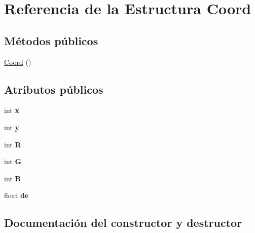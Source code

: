 \hypertarget{structCoord}{}\section{Referencia de la Estructura Coord}
\label{structCoord}
\subsection*{Métodos públicos}
\begin{DoxyCompactItemize}
\item 
\hyperlink{structCoord_add896c4f3fb15b4ad762b5270855345c}{Coord} ()
\end{DoxyCompactItemize}
\subsection*{Atributos públicos}
\begin{DoxyCompactItemize}
\item 
\mbox{\label{structCoord_a696eaa744360fc791d0e3b331c549dbe}} 
int {\bfseries x}
\item 
\mbox{\label{structCoord_a214166cca70cef7dda9201689c3e81ab}} 
int {\bfseries y}
\item 
\mbox{\label{structCoord_a8ead39d3c60427e2d428a15bfbd9b4d7}} 
int {\bfseries R}
\item 
\mbox{\label{structCoord_ae23b32f330c7da521781e27f23341dae}} 
int {\bfseries G}
\item 
\mbox{\label{structCoord_a178fbef489d3631b6f7e68f421cfec37}} 
int {\bfseries B}
\item 
\mbox{\label{structCoord_a1f17c799bd8f733668e637dd706013d9}} 
float {\bfseries de}
\end{DoxyCompactItemize}


\subsection{Documentación del constructor y destructor}
\mbox{\label{structCoord_add896c4f3fb15b4ad762b5270855345c}} 
